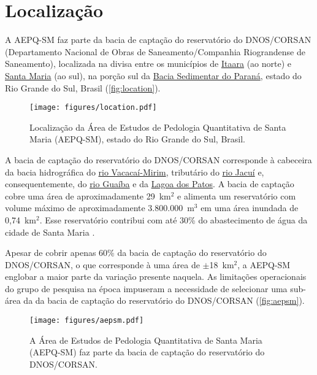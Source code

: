 \documentclass[final]{article}
\begin{document}
\section{Localização}

A AEPQ-SM faz parte da bacia de captação do reservatório do DNOS/CORSAN (Departamento Nacional de Obras de Saneamento/Companhia Riograndense de Saneamento), localizada na divisa entre os municípios de \href{http://pt.wikipedia.org/wiki/Itaara}{Itaara} (ao norte) e \href{http://pt.wikipedia.org/wiki/Santa_Maria_\%28Rio_Grande_do_Sul\%29}{Santa Maria} (ao sul), na porção sul da \href{http://pt.wikipedia.org/wiki/Bacia_do_Paran\%C3\%A1}{Bacia Sedimentar do Paraná}, estado do Rio Grande do Sul, Brasil (\autoref{fig:location}).

\begin{figure}[ht]
  \centering
  \texttt{[image: figures/location.pdf]}
  \caption{Localização da Área de Estudos de Pedologia Quantitativa de Santa 
  Maria (AEPQ-SM), estado do Rio Grande do Sul, Brasil.}
  \label{fig:location}
\end{figure}

A bacia de captação do reservatório do DNOS/CORSAN corresponde à cabeceira da bacia hidrográfica do \href{http://pt.wikipedia.org/wiki/Rio_Vacaca\%C3\%AD-Mirim}{rio Vacacaí-Mirim}, tributário do \href{http://pt.wikipedia.org/wiki/Rio_Jacu\%C3\%AD}{rio Jacuí} e, consequentemente, do \href{http://pt.wikipedia.org/wiki/Lago_Gua\%C3\%ADba}{rio Guaíba} e da \href{http://pt.wikipedia.org/wiki/Lagoa_dos_Patos}{Lagoa dos Patos}. A bacia de captação cobre uma área de aproximadamente 29~km$^2$ e alimenta um reservatório com volume máximo de aproximadamente 3.800.000~m$^3$ em uma área inundada de 0,74~km$^2$. Esse reservatório contribui com até 30\% do abastecimento de água da cidade de Santa Maria \cite{Dias2003, DillEtAl2004, Miguel2010}.

Apesar de cobrir apenas 60\% da bacia de captação do reservatório do DNOS/CORSAN, o que corresponde à uma área de $\pm$18~km$^2$, a AEPQ-SM englobar a maior parte da variação presente naquela. As limitações operacionais do grupo de pesquisa na época impuseram a necessidade de selecionar uma sub-área da da bacia de captação do reservatório do DNOS/CORSAN (\autoref{fig:aepsm}).

\begin{figure}[ht]
  \centering
  \texttt{[image: figures/aepsm.pdf]}
  \caption{A Área de Estudos de Pedologia Quantitativa de Santa Maria (AEPQ-SM) faz parte da bacia de captação do reservatório do DNOS/CORSAN.}
  \label{fig:aepsm}
\end{figure}
\end{document}
